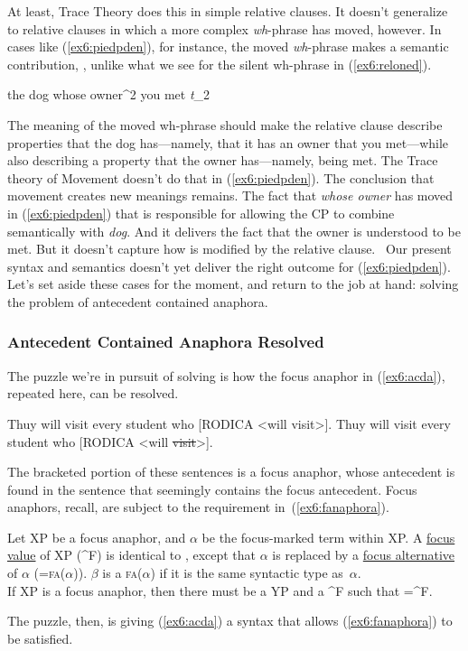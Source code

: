 At least, Trace Theory does this in simple relative clauses. It doesn't generalize to relative clauses in which a more complex \emph{wh}-phrase has moved, however. In cases like (\ref{ex6:piedpden}), for instance, the moved \emph{wh}-phrase makes a semantic contribution, , unlike what we see for the silent wh-phrase in (\ref{ex6:reloned}).
\begin{exe}
\raggedright
	\ex \label{ex6:piedpden}
	the dog whose owner^2 you met \emph{t}_2
\end{exe}
The meaning of the moved wh-phrase should make the relative clause describe properties that the dog has---namely, that it has an owner that you met---while also describing a property that the owner has---namely, being met. The Trace theory of Movement doesn't do that in (\ref{ex6:piedpden}). The conclusion that movement creates new meanings remains. The fact that \emph{whose owner} has moved in (\ref{ex6:piedpden}) that is responsible for allowing the CP to combine semantically with \emph{dog}. And it delivers the fact that the owner is understood to be met. But it doesn't capture how  is modified by the relative clause.%
%
%
% 
\ Our present syntax and semantics doesn't yet deliver the right outcome for (\ref{ex6:piedpden}). Let's set aside these cases for the moment, and return to the job at hand: solving the problem of antecedent contained anaphora.

\subsubsection{Antecedent Contained Anaphora Resolved}
\label{sec:acdresolved}

The puzzle we're in pursuit of solving is how the focus anaphor in (\ref{ex6:acda}), repeated here, can be resolved.
\begin{exe}
	\raggedright
	\begin{xlist}
		\ex Thuy will visit every student who [RODICA <will visit>].
		\ex Thuy will visit every student who [RODICA <will \sout{visit}>].
	\end{xlist}
\end{exe}
The bracketed portion of these sentences is a focus anaphor, whose antecedent is found in the sentence that seemingly contains the focus antecedent. Focus anaphors, recall, are subject to the requirement in~(\ref{ex6:fanaphora}).
\begin{exe}
	\raggedright
	 Let XP be a focus anaphor, and $\alpha$ be the focus-marked term within XP. A \underline{focus value} of XP (^{F}) is identical to , except that $\alpha$ is replaced by a \underline{focus alternative} of $\alpha$ (=\textsc{fa}($\alpha$)). $\beta$ is a \textsc{fa}($\alpha$) if it is the same syntactic type as~$\alpha$.\\[4pt]
	If XP is a focus anaphor, then there must be a YP and a ^F such that =^F.
\end{exe}
The puzzle, then, is giving (\ref{ex6:acda}) a syntax that allows (\ref{ex6:fanaphora}) to be satisfied. 

